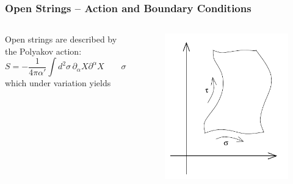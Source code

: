\documentclass[aspectratio=169]{beamer}
\begin{document}
	\begin{frame}
		\frametitle{Open Strings -- Action and Boundary Conditions}
		\begin{columns}
			\begin{column}{0.6\textwidth}
						Open strings are described by the Polyakov action:
				\begin{equation*}
				S = -\frac{1}{4\pi\alpha'} \int d^2\sigma \, \partial_\alpha X \partial^\alpha X \qquad \sigma \in [0,\pi]
				\end{equation*}
				which under variation yields
			\end{column}
			\begin{column}{0.4\textwidth}
				\begin{figure}
					\centering
					\includegraphics[width=0.5\linewidth]{res/open_string}
				\end{figure}
				

\end{column}
\end{columns}
\end{frame}
\end{document}

